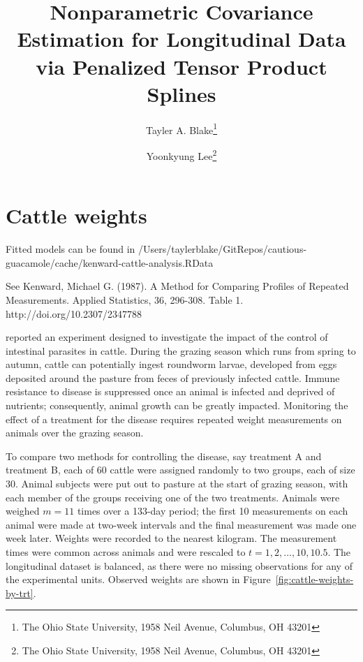 \documentclass[12pt]{article}
\theoremstyle{definition}
\def\bL{\mathbf{L}}
\begin{document}
\def\bL{\mathbf{L}}



\title{ Nonparametric Covariance Estimation for Longitudinal Data via Penalized Tensor Product Splines}

\author{Tayler A. Blake\thanks{The Ohio State University, 1958 Neil Avenue, Columbus, OH 43201} \and  Yoonkyung Lee\thanks{The Ohio State University, 1958 Neil Avenue, Columbus, OH 43201}}


\maketitle

\section{Cattle weights}

Fitted models can be found in 
/Users/taylerblake/GitRepos/cautious-guacamole/cache/kenward-cattle-analysis.RData

See Kenward, Michael G. (1987). A Method for Comparing Profiles of Repeated Measurements. Applied Statistics, 36, 296-308. Table 1. http://doi.org/10.2307/2347788


\citet{kenward1987method} reported an experiment designed to investigate the impact of the control of intestinal parasites in cattle. During the grazing season which runs from spring to autumn, cattle can potentially ingest roundworm larvae, developed from eggs deposited around the pasture from feces of previously infected cattle. Immune resistance to disease is suppressed once an animal is infected and deprived of nutrients; consequently, animal growth can be greatly impacted. Monitoring the effect of a treatment for the disease requires repeated weight measurements on animals over the grazing season. 

To compare two methods for controlling the disease, say treatment A and treatment B, each of 60 cattle were assigned randomly to two groups, each of size 30. Animal subjects were put out to pasture at the start of grazing season, with each member of the groups receiving one of the two treatments. Animals were weighed $m = 11$ times over a 133-day period; the first 10 measurements on each animal were made at two-week intervals and the final measurement was made one week later. Weights were recorded to the nearest kilogram. The measurement times were common across animals and were rescaled to $t = 1, 2, \dots, 10, 10.5$. The longitudinal dataset is balanced, as there were no missing observations for any of the experimental units. Observed weights are shown in Figure~\ref{fig:cattle-weights-by-trt}.
  
\end{document}

